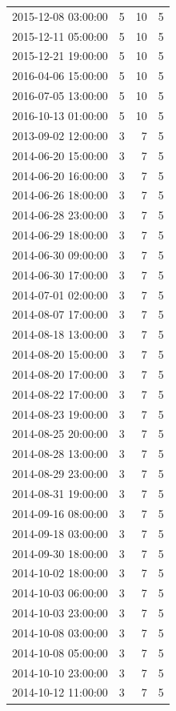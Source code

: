\begin{tabular}{lrrr}
2015-12-08 03:00:00 & 5 & 10 & 5 \\
2015-12-11 05:00:00 & 5 & 10 & 5 \\
2015-12-21 19:00:00 & 5 & 10 & 5 \\
2016-04-06 15:00:00 & 5 & 10 & 5 \\
2016-07-05 13:00:00 & 5 & 10 & 5 \\
2016-10-13 01:00:00 & 5 & 10 & 5 \\
2013-09-02 12:00:00 & 3 & 7 & 5 \\
2014-06-20 15:00:00 & 3 & 7 & 5 \\
2014-06-20 16:00:00 & 3 & 7 & 5 \\
2014-06-26 18:00:00 & 3 & 7 & 5 \\
2014-06-28 23:00:00 & 3 & 7 & 5 \\
2014-06-29 18:00:00 & 3 & 7 & 5 \\
2014-06-30 09:00:00 & 3 & 7 & 5 \\
2014-06-30 17:00:00 & 3 & 7 & 5 \\
2014-07-01 02:00:00 & 3 & 7 & 5 \\
2014-08-07 17:00:00 & 3 & 7 & 5 \\
2014-08-18 13:00:00 & 3 & 7 & 5 \\
2014-08-20 15:00:00 & 3 & 7 & 5 \\
2014-08-20 17:00:00 & 3 & 7 & 5 \\
2014-08-22 17:00:00 & 3 & 7 & 5 \\
2014-08-23 19:00:00 & 3 & 7 & 5 \\
2014-08-25 20:00:00 & 3 & 7 & 5 \\
2014-08-28 13:00:00 & 3 & 7 & 5 \\
2014-08-29 23:00:00 & 3 & 7 & 5 \\
2014-08-31 19:00:00 & 3 & 7 & 5 \\
2014-09-16 08:00:00 & 3 & 7 & 5 \\
2014-09-18 03:00:00 & 3 & 7 & 5 \\
2014-09-30 18:00:00 & 3 & 7 & 5 \\
2014-10-02 18:00:00 & 3 & 7 & 5 \\
2014-10-03 06:00:00 & 3 & 7 & 5 \\
2014-10-03 23:00:00 & 3 & 7 & 5 \\
2014-10-08 03:00:00 & 3 & 7 & 5 \\
2014-10-08 05:00:00 & 3 & 7 & 5 \\
2014-10-10 23:00:00 & 3 & 7 & 5 \\
2014-10-12 11:00:00 & 3 & 7 & 5 \\

\end{tabular}
